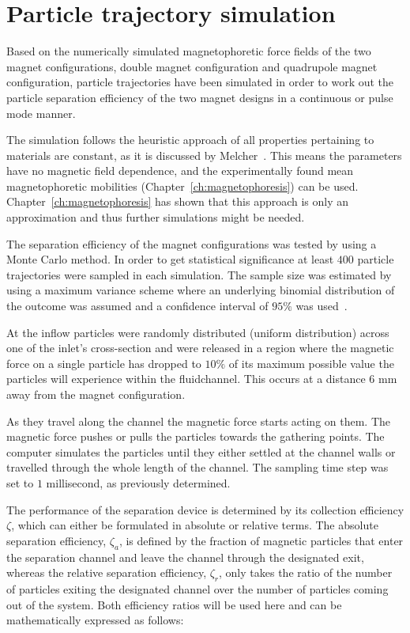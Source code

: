 \section{Particle trajectory simulation}\label{sec:particleTrajectorySimualation}
Based on the numerically simulated magnetophoretic force fields of the two magnet configurations, double magnet configuration and quadrupole magnet configuration, particle trajectories have been simulated in order to work out the particle separation efficiency of the two magnet designs in a continuous or pulse mode manner. 

The simulation follows the heuristic approach of all properties pertaining to materials are constant, as it is discussed by Melcher~\cite{Melcher1981}. This means the parameters have no magnetic field dependence, and the experimentally found mean magnetophoretic mobilities (Chapter~\ref{ch:magnetophoresis}) can be used. Chapter~\ref{ch:magnetophoresis} has shown that this approach is only an approximation and thus further simulations might be needed. 

The separation efficiency of the magnet configurations was tested by using a Monte Carlo method. In order to get statistical significance at least $400$ particle trajectories were sampled in each simulation. The sample size was estimated by using a maximum variance scheme where an underlying binomial distribution of the outcome was assumed and a confidence interval of $95\%$ was used~\cite{Kreyszig2006}. 

At the inflow particles were randomly distributed (uniform distribution) across one of the inlet's cross-section and were released in a region where the magnetic force on a single particle has dropped to $10\%$ of its maximum possible value the particles will experience within the fluidchannel. This occurs at a distance $6$ mm away from the magnet configuration. 

As they travel along the channel the magnetic force starts acting on them. The magnetic force pushes or pulls the particles towards the gathering points. The computer simulates the particles until they either settled at the channel walls or travelled through the whole length of the channel. The sampling time step was set to $1$ millisecond, as previously determined. 

The performance of the separation device is determined by its collection efficiency $\zeta$, which can either be formulated in absolute or relative terms. The absolute separation efficiency, $\zeta_{a}$, is defined by the fraction of magnetic particles that enter the separation channel and leave the channel through the designated exit, whereas the relative separation efficiency, $\zeta_{r}$, only takes the ratio of the number of particles exiting the designated channel over the number of particles coming out of the system. Both efficiency ratios will be used here and can be mathematically expressed as follows:

